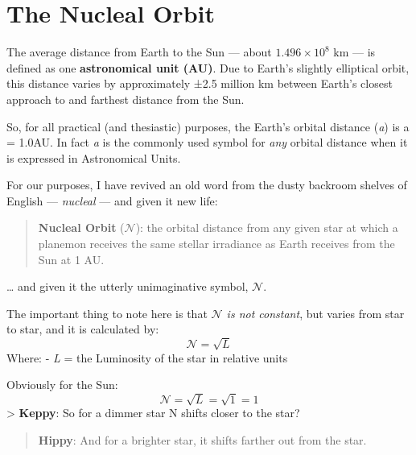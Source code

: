 \documentclass[
  letterpaper,
]{book}
\begin{document}
\section{The Nucleal Orbit}\label{the-nucleal-orbit}

The average distance from Earth to the Sun --- about
\(1.496 \times 10^8\) km --- is defined as one \textbf{astronomical unit
(AU)}. Due to Earth's slightly elliptical orbit, this distance varies by
approximately ±2.5 million km between Earth's closest approach to and
farthest distance from the Sun.

So, for all practical (and thesiastic) purposes, the Earth's orbital
distance (\emph{a}) is a = 1.0AU. In fact \emph{a} is the commonly used
symbol for \emph{any} orbital distance when it is expressed in
Astronomical Units.

For our purposes, I have revived an old word from the dusty backroom
shelves of English --- \emph{nucleal} --- and given it new life:

\begin{quote}
\textbf{Nucleal Orbit} (\(\mathcal{N}\)): the orbital distance from any
given star at which a planemon receives the same stellar irradiance as
Earth receives from the Sun at 1 AU.
\end{quote}

\ldots{} and given it the utterly unimaginative symbol, \(\mathcal{N}\).

The important thing to note here is that \emph{\(\mathcal{N}\) is not
constant}, but varies from star to star, and it is calculated by: \[
\mathcal{N} = \sqrt{L}
\] Where: - \emph{L} = the Luminosity of the star in relative units

Obviously for the Sun: \[
\mathcal{N} = \sqrt{L} = \sqrt{1} = 1
\] \textgreater{} \textbf{Keppy}: So for a dimmer star N shifts closer
to the star?

\begin{quote}
\textbf{Hippy}: And for a brighter star, it shifts farther out from the
star.
\end{quote}
\end{document}
